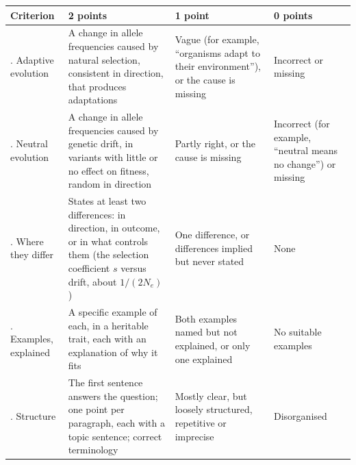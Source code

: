 \documentclass[
  a4paper]{book}
\newcounter{none} %
\begin{document}
{\def\LTcaptype{none} %
\begin{longtable}[]{@{}
  >{\raggedright\arraybackslash}p{}
  >{\raggedright\arraybackslash}p{}
  >{\raggedright\arraybackslash}p{}
  >{\raggedright\arraybackslash}p{}@{}}
\toprule\noalign{}
\begin{minipage}[b]{\linewidth}\raggedright
Criterion
\end{minipage} & \begin{minipage}[b]{\linewidth}\raggedright
2 points
\end{minipage} & \begin{minipage}[b]{\linewidth}\raggedright
1 point
\end{minipage} & \begin{minipage}[b]{\linewidth}\raggedright
0 points
\end{minipage} \\
\midrule\noalign{}
\endhead
\bottomrule\noalign{}
\endlastfoot
1. Adaptive evolution & A change in allele frequencies caused by natural selection, consistent in direction, that produces adaptations & Vague (for example, ``organisms adapt to their environment''), or the cause is missing & Incorrect or missing \\
2. Neutral evolution & A change in allele frequencies caused by genetic drift, in variants with little or no effect on fitness, random in direction & Partly right, or the cause is missing & Incorrect (for example, ``neutral means no change'') or missing \\
3. Where they differ & States at least two differences: in direction, in outcome, or in what controls them (the selection coefficient \(s\) versus drift, about \(1/(2N_e)\)) & One difference, or differences implied but never stated & None \\
4. Examples, explained & A specific example of each, in a heritable trait, each with an explanation of why it fits & Both examples named but not explained, or only one explained & No suitable examples \\
5. Structure & The first sentence answers the question; one point per paragraph, each with a topic sentence; correct terminology & Mostly clear, but loosely structured, repetitive or imprecise & Disorganised \\
\end{longtable}
}
\end{document}
